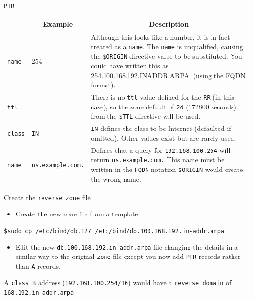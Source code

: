 \documentclass[xcolor=table]{beamer}
\begin{document}
\begin{frame}{\texttt{PTR}}
  \begin{table}
    \tiny
    \begin{tabular}{|p{1.6cm}|p{1.6cm}|p{4.7cm}|} 
      \hline
      \rowcolor{gray}
      \multicolumn{1}{|c|}{Syntax} & \multicolumn{1}{c|}{Example} & \multicolumn{1}{c|}{Description}\\ 
      \hline
      \texttt{name}&254&Although this looks like a number, it is in fact treated as a \texttt{name}. The \texttt{name} is unqualified, causing the \texttt{\$ORIGIN} directive value to be substituted. You could have written this as 254.100.168.192.INADDR.ARPA. (using the FQDN format).\\
      \hline
      \texttt{ttl}&&There is no \texttt{ttl} value defined for the \texttt{RR} (in this case), so the zone default of \texttt{2d} (172800 seconds) from the \texttt{\$TTL} directive will be used.\\
      \hline
      \texttt{class}&\texttt{IN}&\texttt{IN} defines the class to be Internet (defaulted if omitted). Other values exist but are rarely used.\\
      \hline
      \texttt{name}&\texttt{ns.example.com.}&Defines that a query for \texttt{192.168.100.254} will return \texttt{ns.example.com.} This name must be written in the \texttt{FQDN} notation \texttt{\$ORIGIN} would create the wrong name.\\
      \hline
    \end{tabular}
  \end{table}
\end{frame}

\begin{frame}{Create the \texttt{reverse zone} file}
  \begin{itemize}
    \item Create the new zone file from a template
  \end{itemize}
  \begin{tcolorbox}
    \begin{center}
      \texttt{\scriptsize\$sudo cp /etc/bind/db.127 /etc/bind/db.100.168.192.in-addr.arpa}
    \end{center}
  \end{tcolorbox}
  \begin{itemize}
    \item  Edit the new \texttt{db.100.168.192.in-addr.arpa} file changing the details in a similar way to the original \texttt{zone} file except you now add \texttt{PTR} records rather than \texttt{A} records.
  \end{itemize}
  \begin{tcolorbox}[title={\textbf{NOTE:}}]
    \begin{center}
      \scriptsize A \texttt{class B} address (\texttt{192.168.100.254/16}) would have a \texttt{reverse domain} of \texttt{168.192.in-addr.arpa}
    \end{center}
  \end{tcolorbox}
\end{frame}
\end{document}
